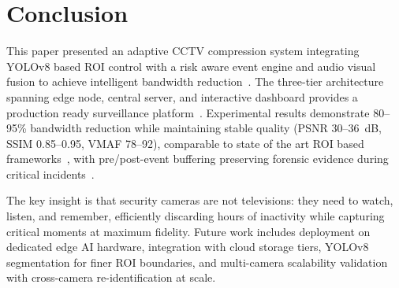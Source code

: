 \documentclass[conference]{IEEEtran}
\begin{document}
\section{Conclusion}
This paper presented an adaptive CCTV compression system integrating YOLOv8 based ROI control with a risk aware event engine and audio visual fusion to achieve intelligent bandwidth reduction~\cite{jocher2023yolov8,gadot2025rlrc}. The three-tier architecture spanning edge node, central server, and interactive dashboard provides a production ready surveillance platform~\cite{liu2025edge}. Experimental results demonstrate 80--95\% bandwidth reduction while maintaining stable quality (PSNR 30--36~dB, SSIM 0.85--0.95, VMAF 78--92), comparable to state of the art ROI based frameworks~\cite{wang2025compression,agrawal2025frvc}, with pre/post-event buffering preserving forensic evidence during critical incidents~\cite{chuang2025adaptive}.

The key insight is that security cameras are not televisions: they need to watch, listen, and remember, efficiently discarding hours of inactivity while capturing critical moments at maximum fidelity. Future work includes deployment on dedicated edge AI hardware, integration with cloud storage tiers, YOLOv8 segmentation for finer ROI boundaries, and multi-camera scalability validation with cross-camera re-identification at scale.



\end{document}
